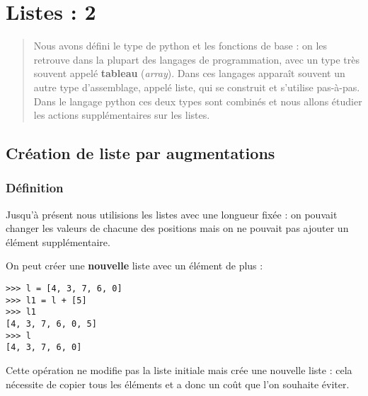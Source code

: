 \chapter{Listes : 2}
\thispagestyle{empty}
\begin{abstract}
Nous avons défini le type  de python et les fonctions de base : on les retrouve dans la plupart des langages de programmation, avec un type très souvent appelé {\bf tableau} ({\it array}). Dans ces langages apparaît souvent un autre type d'assemblage, appelé liste, qui se construit et s'utilise pas-à-pas. Dans le langage python ces deux types sont combinés et nous allons étudier les actions supplémentaires sur les listes.
\end{abstract}
\section{Création de liste par augmentations}
\subsection{Définition}
Jusqu'à présent nous utilisions les listes avec une longueur fixée : on pouvait changer les valeurs de chacune des positions mais on ne pouvait pas ajouter un élément supplémentaire.

On peut créer une {\bf nouvelle} liste avec un élément de plus :
\begin{lstlisting}
>>> l = [4, 3, 7, 6, 0]
>>> l1 = l + [5]
>>> l1
[4, 3, 7, 6, 0, 5]
>>> l
[4, 3, 7, 6, 0]
\end{lstlisting}
Cette opération ne modifie pas la liste initiale mais crée une nouvelle liste : cela nécessite de copier tous les éléments et a donc un coût que l'on souhaite éviter.

